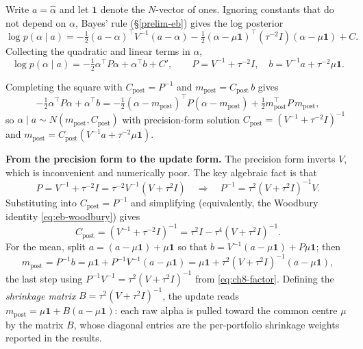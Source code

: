 Write $a=\hat\alpha$ and let $\mathbf{1}$ denote the $N$-vector of ones.
Ignoring constants that do not depend on $\alpha$, Bayes' rule
(\S\ref{prelim-eb}) gives the log posterior
\begin{equation}\label{eq:ch8-logpost}
\log p(\alpha\mid a) = -\tfrac12(a-\alpha)^{\top}V^{-1}(a-\alpha)
 - \tfrac12(\alpha-\mu\mathbf{1})^{\top}(\tau^{-2}I)(\alpha-\mu\mathbf{1}) + C.
\end{equation}
Collecting the quadratic and linear terms in $\alpha$,
\begin{equation}\label{eq:ch8-precision}
\log p(\alpha\mid a) = -\tfrac12\alpha^{\top}P\alpha + \alpha^{\top}b + C',
\qquad P = V^{-1}+\tau^{-2}I,\quad b = V^{-1}a+\tau^{-2}\mu\mathbf{1}.
\end{equation}

Completing the square with $C_{\mathrm{post}}=P^{-1}$ and
$m_{\mathrm{post}}=C_{\mathrm{post}}\,b$ gives
\begin{equation}\label{eq:ch8-complete}
-\tfrac12\alpha^{\top}P\alpha+\alpha^{\top}b
= -\tfrac12(\alpha-m_{\mathrm{post}})^{\top}P(\alpha-m_{\mathrm{post}})
 + \tfrac12 m_{\mathrm{post}}^{\top}P\,m_{\mathrm{post}},
\end{equation}
so $\alpha\mid a\sim N(m_{\mathrm{post}},C_{\mathrm{post}})$ with precision-form
solution $C_{\mathrm{post}}=(V^{-1}+\tau^{-2}I)^{-1}$ and
$m_{\mathrm{post}}=C_{\mathrm{post}}(V^{-1}a+\tau^{-2}\mu\mathbf{1})$.

\textbf{From the precision form to the update form.} The precision form
inverts $V$, which is inconvenient and numerically poor. The key algebraic
fact is that
\begin{equation}\label{eq:ch8-factor}
P = V^{-1}+\tau^{-2}I = \tau^{-2}V^{-1}(V+\tau^2 I)
\quad\Longrightarrow\quad
P^{-1} = \tau^2 (V+\tau^2 I)^{-1} V .
\end{equation}
Substituting into $C_{\mathrm{post}}=P^{-1}$ and simplifying (equivalently,
the Woodbury identity \eqref{eq:eb-woodbury}) gives
\begin{equation}\label{eq:ch8-Cpost}
C_{\mathrm{post}} = (V^{-1}+\tau^{-2}I)^{-1} = \tau^2 I - \tau^4 (V+\tau^2 I)^{-1}.
\end{equation}
For the mean, split $a=(a-\mu\mathbf{1})+\mu\mathbf{1}$ so that
$b=V^{-1}(a-\mu\mathbf{1})+P\mu\mathbf{1}$; then
\begin{equation}\label{eq:ch8-mpost-deriv}
m_{\mathrm{post}} = P^{-1}b
= \mu\mathbf{1} + P^{-1}V^{-1}(a-\mu\mathbf{1})
= \mu\mathbf{1} + \tau^2(V+\tau^2 I)^{-1}(a-\mu\mathbf{1}),
\end{equation}
the last step using $P^{-1}V^{-1}=\tau^2(V+\tau^2 I)^{-1}$ from
\eqref{eq:ch8-factor}. Defining the \emph{shrinkage matrix}
$B=\tau^2(V+\tau^2 I)^{-1}$, the update reads
$m_{\mathrm{post}}=\mu\mathbf{1}+B(a-\mu\mathbf{1})$: each raw alpha is pulled
toward the common centre $\mu$ by the matrix $B$, whose diagonal entries are
the per-portfolio shrinkage weights reported in the results.

